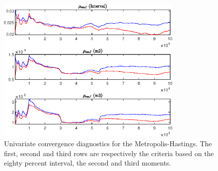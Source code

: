 \begin{figure}[H]
\centering 
\includegraphics[width=0.80\textwidth]{BRS_sectoral/Output/BRS_sectoral_udiag13}
\caption{Univariate convergence diagnostics for the Metropolis-Hastings.
The first, second and third rows are respectively the criteria based on
the eighty percent interval, the second and third moments.}\label{Fig:UnivariateDiagnostics:13}
\end{figure}

